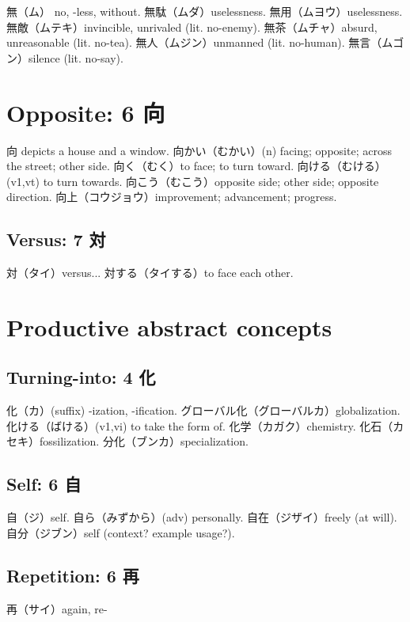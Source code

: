 無（ム） no, -less, without.
無駄（ムダ）uselessness.
無用（ムヨウ）uselessness.
無敵（ムテキ）invincible, unrivaled (lit. no-enemy).
無茶（ムチャ）absurd, unreasonable (lit. no-tea).
無人（ムジン）unmanned (lit. no-human).
無言（ムゴン）silence (lit. no-say).

\section{Opposite: 6 向}

向 depicts a house and a window.
向かい（むかい）(n) facing; opposite; across the street; other side.
向く（むく）to face; to turn toward.
向ける（むける）(v1,vt) to turn towards.
向こう（むこう）opposite side; other side; opposite direction.
向上（コウジョウ）improvement; advancement; progress.

\subsection{Versus: 7 対}

対（タイ）versus...
対する（タイする）to face each other.

\section{Productive abstract concepts}

\subsection{Turning-into: 4 化}

化（カ）(suffix) -ization, -ification.
グローバル化（グローバルカ）globalization.
化ける（ばける）(v1,vi) to take the form of.
化学（カガク）chemistry.
化石（カセキ）fossilization.
分化（ブンカ）specialization.

\subsection{Self: 6 自}

自（ジ）self.
自ら（みずから）(adv) personally.
自在（ジザイ）freely (at will).
自分（ジブン）self (context? example usage?).

\subsection{Repetition: 6 再}

再（サイ）again, re-

